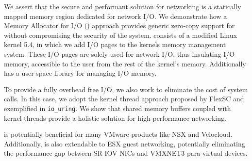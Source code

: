 
We assert that the secure and performant solution for networking is a statically mapped memory region dedicated for network I/O. We demonstrate how a Memory Allocator for I/O (\oursys) approach provides generic zero-copy support for \sockets without compromising the security of the system. 
\oursys consists of a modified Linux kernel 5.4, in which we add I/O pages to the kernels memory management system. These I/O pages are solely used for network I/O, thus insulating I/O memory, accessible to the user from the rest of the kernel's memory. Additionally \oursys has a user-space library for managing I/O memory. %

To provide a fully overhead free I/O, we also work to eliminate the cost of system calls. In this case, we adopt the kernel thread approach proposed by FlexSC\cite{flexsc} and exemplified in \texttt{io\_uring}\cite{io-uring}. We show that shared memory buffers coupled with kernel threads provide a holistic solution for high-performance networking.

\oursys is potentially beneficial for many VMware products like NSX and Velocloud. Additionally, \oursys is also extendable to ESX guest networking, potentially eliminating the performance gap between SR-IOV NICs and VMXNET3 para-virtual devices. %